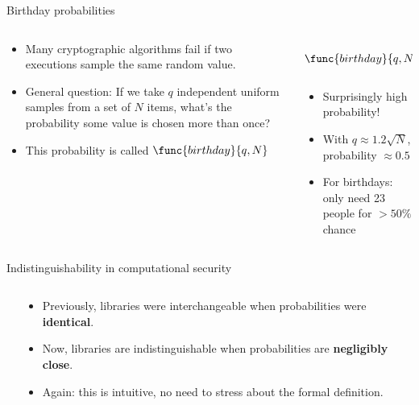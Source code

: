 \documentclass[aspectratio=169, lualatex, handout]{beamer}
\begin{document}
\begin{frame}{Birthday probabilities}
	\begin{columns}[c]
		\begin{column}{0.6\textwidth}
			\begin{itemize}
				\item Many cryptographic algorithms fail if two executions sample the same random value.
				\item General question: If we take $q$ independent uniform samples from a set of $N$ items, what's the probability some value is chosen more than once?
				\item This probability is called $\func{birthday}{q,N}$
			\end{itemize}
		\end{column}
		\begin{column}{0.4\textwidth}
			\begin{align*}
				\func{birthday}{q,N} = 1 - \prod_{i=1}^{q-1} \left(1 - \frac{i}{N}\right)
			\end{align*}
			\begin{itemize}
				\item Surprisingly high probability!
				\item With $q \approx 1.2\sqrt{N}$, probability $\approx 0.5$
				\item For birthdays: only need 23 people for $>50\%$ chance
			\end{itemize}
		\end{column}
	\end{columns}
\end{frame}

\begin{frame}{Indistinguishability in computational security}
	\begin{columns}[c]
		\begin{column}{0.6\textwidth}
		\end{column}
		\begin{column}{0.4\textwidth}
			\begin{itemize}
				\item Previously, libraries were interchangeable when probabilities were \textbf{identical}.
				\item Now, libraries are indistinguishable when probabilities are \textbf{negligibly close}.
				\item Again: this is intuitive, no need to stress about the formal definition.
			\end{itemize}
		\end{column}
	\end{columns}
\end{frame}
\end{document}
